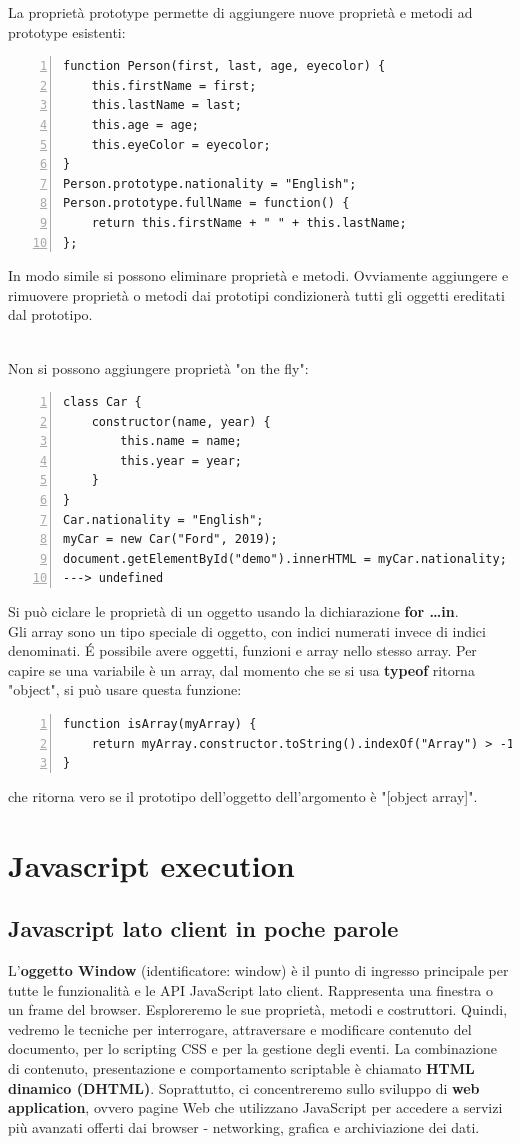 La proprietà prototype permette di aggiungere nuove proprietà e metodi ad prototype esistenti:
\begin{Verbatim}[numbers=left, frame=single]
function Person(first, last, age, eyecolor) {
    this.firstName = first;
    this.lastName = last;
    this.age = age;
    this.eyeColor = eyecolor;
}
Person.prototype.nationality = "English";
Person.prototype.fullName = function() {
    return this.firstName + " " + this.lastName;
};
\end{Verbatim}
In modo simile si possono eliminare proprietà e metodi. Ovviamente aggiungere e rimuovere proprietà o metodi dai prototipi condizionerà tutti gli oggetti ereditati dal prototipo. \\\

Non si possono aggiungere proprietà "on the fly":
\begin{Verbatim}[numbers=left, frame=single]
class Car {
    constructor(name, year) {
        this.name = name;
        this.year = year;
    }
}
Car.nationality = "English";
myCar = new Car("Ford", 2019);
document.getElementById("demo").innerHTML = myCar.nationality;
---> undefined
\end{Verbatim}
Si può ciclare le proprietà di un oggetto usando la dichiarazione \textbf{for \dots in}.\\

Gli array sono un tipo speciale di oggetto, con indici numerati invece di indici denominati. \'E possibile avere oggetti, funzioni e array nello stesso array. Per capire se una variabile è un array, dal momento che se si usa \textbf{typeof} ritorna "object", si può usare questa funzione:
\begin{Verbatim}[numbers=left, frame=single]
function isArray(myArray) {
    return myArray.constructor.toString().indexOf("Array") > -1;
}
\end{Verbatim}
che ritorna vero se il prototipo dell'oggetto dell'argomento è "[object array]".



\chapter{Javascript execution}
\section{Javascript lato client in poche parole}
L'\textbf{oggetto Window} (identificatore: window) è il punto di ingresso principale per tutte le funzionalità e le API JavaScript lato client. Rappresenta una finestra o un frame del browser. Esploreremo le sue proprietà, metodi e costruttori.
Quindi, vedremo le tecniche per interrogare, attraversare e modificare
contenuto del documento, per lo scripting CSS e per la gestione degli eventi. La combinazione di contenuto, presentazione e comportamento scriptable è chiamato \textbf{HTML dinamico (DHTML)}. Soprattutto, ci concentreremo sullo sviluppo di \textbf{web application}, ovvero pagine Web che utilizzano JavaScript per accedere a servizi più avanzati offerti dai browser - networking, grafica e archiviazione dei dati.

